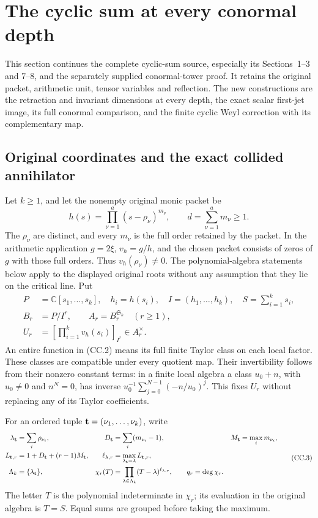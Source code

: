 \section{The cyclic sum at every conormal depth}
\label{sec:cyclic-sum-conormal}

This section continues the complete cyclic-sum source, especially its
Sections~1--3 and 7--8, and the separately supplied conormal-tower proof.
It retains the original packet, arithmetic unit, tensor variables and
reflection.  The new constructions are the retraction and invariant
dimensions at every depth, the exact scalar first-jet image, its full
conormal comparison, and the finite cyclic Weyl correction with its
complementary map.

\subsection{Original coordinates and the exact collided annihilator}

Let \(k\geq1\), and let the nonempty original monic packet be
\[
 h(s)=\prod_{\nu=1}^{a}(s-\rho_\nu)^{m_\nu},
 \qquad d=\sum_{\nu=1}^{a}m_\nu\geq1.
 \tag{CC.1}
\]
The \(\rho_\nu\) are distinct, and every \(m_\nu\) is the full order
retained by the packet.  In the arithmetic application
\(g=2\xi\), \(v_h=g/h\), and the chosen packet consists of zeros of
\(g\) with those full orders.  Thus \(v_h(\rho_\nu)\ne0\).
The polynomial-algebra statements below apply to the displayed original
roots without any assumption that they lie on the critical line.
Put
\[
\begin{split}
 P&=\mathbb C[s_1,\ldots,s_k],\quad h_i=h(s_i),\quad I=(h_1,\ldots,h_k),
 \quad S=\sum_{i=1}^k s_i,\\
 B_r&=P/I^r,\qquad A_r=B_r^{\mathfrak S_k}\quad(r\geq1),\\
 U_r&=\left[\prod_{i=1}^k v_h(s_i)\right]_{I^r}\in A_r^\times .
\end{split}
\tag{CC.2}
\]
An entire function in (CC.2) means its full finite Taylor class on
each local factor.  These classes are compatible under every quotient
map.  Their invertibility follows from their nonzero constant terms:
in a finite local algebra a class \(u_0+n\), with \(u_0\ne0\) and
\(n^N=0\), has inverse
\(u_0^{-1}\sum_{j=0}^{N-1}(-n/u_0)^j\).
This fixes \(U_r\) without replacing any of its Taylor coefficients.

For an ordered tuple \({\bf t}=(\nu_1,\ldots,\nu_k)\), write
\[
\begin{split}
 \lambda_{\bf t}&=\sum_i\rho_{\nu_i},&
 D_{\bf t}&=\sum_i(m_{\nu_i}-1),&
 M_{\bf t}&=\max_i m_{\nu_i},\\
 L_{{\bf t},r}&=1+D_{\bf t}+(r-1)M_{\bf t},&
 \ell_{\lambda,r}&=\max_{\lambda_{\bf t}=\lambda}L_{{\bf t},r},\\
 \Lambda_k&=\{\lambda_{\bf t}\},&
 \chi_r(T)&=\prod_{\lambda\in\Lambda_k}(T-\lambda)^{\ell_{\lambda,r}},
 \qquad q_r=\deg\chi_r .
\end{split}
\tag{CC.3}
\]
The letter \(T\) is the polynomial indeterminate in \(\chi_r\);
its evaluation in the original algebra is \(T=S\).
Equal sums are grouped before taking the maximum.

